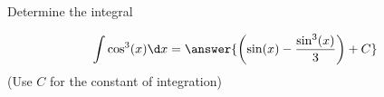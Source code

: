 \documentclass{ximera}
\author{Jason Miller}
\begin{document}
\begin{exercise}
Determine the integral

\[
\int \cos^{3}(x) \d x= \answer{  \left( \sin(x) -\frac{ \sin^{3}(x)}{3} \right)   +C  }
\]
(Use $C$ for the constant of integration)

\end{exercise}
\end{document}
